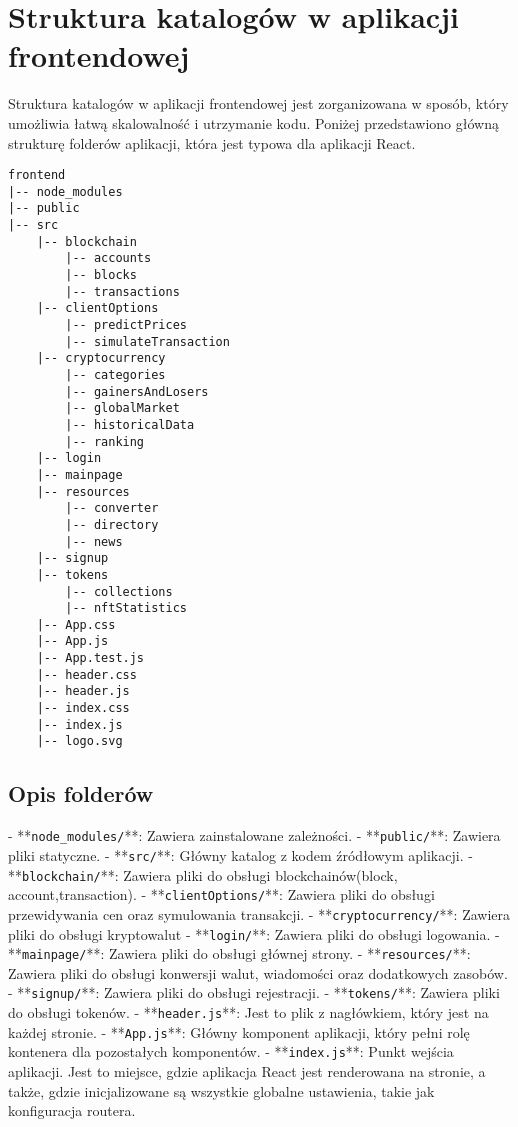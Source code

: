 \section{Struktura katalogów w aplikacji frontendowej}

Struktura katalogów w aplikacji frontendowej jest zorganizowana w sposób, który umożliwia łatwą skalowalność i utrzymanie kodu. Poniżej przedstawiono główną strukturę folderów aplikacji, która jest typowa dla aplikacji React.
{\footnotesize
\begin{verbatim}
frontend
|-- node_modules
|-- public
|-- src
    |-- blockchain
        |-- accounts
        |-- blocks
        |-- transactions
    |-- clientOptions
        |-- predictPrices
        |-- simulateTransaction
    |-- cryptocurrency
        |-- categories
        |-- gainersAndLosers
        |-- globalMarket
        |-- historicalData
        |-- ranking
    |-- login
    |-- mainpage
    |-- resources
        |-- converter
        |-- directory
        |-- news
    |-- signup
    |-- tokens
        |-- collections
        |-- nftStatistics
    |-- App.css
    |-- App.js
    |-- App.test.js
    |-- header.css
    |-- header.js
    |-- index.css
    |-- index.js
    |-- logo.svg
\end{verbatim}
}

\subsection{Opis folderów}

- **\texttt{node\_modules/}**: Zawiera zainstalowane zależności.
- **\texttt{public/}**: Zawiera pliki statyczne.
- **\texttt{src/}**: Główny katalog z kodem źródłowym aplikacji.
  - **\texttt{blockchain/}**: Zawiera pliki do obsługi blockchainów(block, account,transaction). 
	- **\texttt{clientOptions/}**: Zawiera pliki do obsługi przewidywania cen oraz symulowania transakcji. 
	- **\texttt{cryptocurrency/}**: Zawiera pliki do obsługi kryptowalut 
	- **\texttt{login/}**: Zawiera pliki do obsługi logowania. 
	- **\texttt{mainpage/}**: Zawiera pliki do obsługi głównej strony. 
	- **\texttt{resources/}**: Zawiera pliki do obsługi konwersji walut, wiadomości oraz dodatkowych zasobów. 
	- **\texttt{signup/}**: Zawiera pliki do obsługi rejestracji. 
	- **\texttt{tokens/}**: Zawiera pliki do obsługi tokenów. 
	- **\texttt{header.js}**: Jest to plik z nagłówkiem, który jest na każdej stronie. 
  - **\texttt{App.js}**: Główny komponent aplikacji, który pełni rolę kontenera dla pozostałych komponentów. 
  - **\texttt{index.js}**: Punkt wejścia aplikacji. Jest to miejsce, gdzie aplikacja React jest renderowana na stronie, a także, gdzie inicjalizowane są wszystkie globalne ustawienia, takie jak konfiguracja routera.
